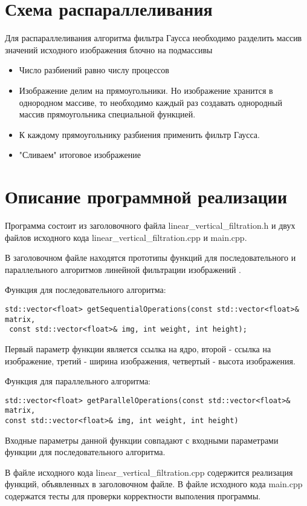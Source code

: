 \documentclass{report}
\begin{document}
\newpage

\section*{Схема распараллеливания}
\par 
Для распараллеливания алгоритма фильтра Гаусса необходимо разделить массив значений исходного изображения блочно на подмассивы
\begin{itemize}
\item Число разбиений равно числу процессов 
\item Изображение делим на прямоугольники. Но изображение хранится в однородном массиве, то необходимо каждый раз создавать однородный массив прямоугольника специальной функцией.
\item К каждому прямоугольнику разбиения применить фильтр Гаусса.
\item "Сливаем" итоговое изображение
\end{itemize}
\newpage

\section*{Описание программной реализации}
Программа состоит из заголовочного файла linear\_vertical\_filtration.h и двух файлов исходного кода linear\_vertical\_filtration.cpp и main.cpp.
\par В заголовочном файле находятся прототипы функций для последовательного и параллельного алгоритмов линейной фильтрации изображений .
\par Функция для последовательного алгоритма:
\begin{lstlisting}
std::vector<float> getSequentialOperations(const std::vector<float>& matrix,
 const std::vector<float>& img, int weight, int height);
\end{lstlisting}
Первый параметр функции является ссылка на ядро, второй - ссылка на изображение, третий - ширина изображения, четвертый - высота изображения.
\par Функция для параллельного
алгоритма:
\begin{lstlisting}
std::vector<float> getParallelOperations(const std::vector<float>& matrix,
const std::vector<float>& img, int weight, int height) 
\end{lstlisting}
Входные параметры данной функции совпадают с входными параметрами функции для последовательного алгоритма.
\par В файле исходного кода linear\_vertical\_filtration.cpp содержится реализация функций, объявленных в заголовочном файле. В файле исходного кода main.cpp содержатся тесты для проверки корректности выполения программы.
\newpage
\end{document}
